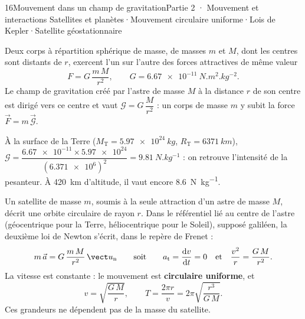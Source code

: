\begin{ouverture}[gravitation]{16}{Mouvement dans un champ de gravitation}{Partie 2 · Mouvement et interactions}
{Satellites et planètes\enspace·\enspace Mouvement circulaire uniforme\enspace·\enspace Lois de Kepler\enspace·\enspace Satellite géostationnaire}
\end{ouverture}
\essentiel
{}
\begin{loi}
Deux corps à répartition sphérique de masse, de masses $m$ et $M$, dont les centres sont distants de $r$, exercent l'un
sur l'autre des forces attractives de même valeur
\[F=G\,\frac{m\,M}{r^2},\qquad G=\qty{6,67e-11}{N.m^2.kg^{-2}}.\]
Le champ de gravitation créé par l'astre de masse $M$ à la distance $r$ de son centre est dirigé vers ce centre et vaut
$\mathcal{G}=G\,\dfrac{M}{r^2}$ : un corps de masse $m$ y subit la force $\vec{F}=m\,\vec{\mathcal{G}}$.
\end{loi}
\begin{exemple}
À la surface de la Terre ($M_\mathrm{T}=\qty{5,97e24}{kg}$, $R_\mathrm{T}=\qty{6371}{km}$),
$\mathcal{G}=\dfrac{\num{6.67e-11}\times\num{5.97e24}}{(\num{6.371e6})^2}=\qty{9,81}{N.kg^{-1}}$ : on retrouve l'intensité de la
pesanteur. À 420~km d'altitude, il vaut encore \qty{8,6}{N.kg^{-1}}.
\end{exemple}
\begin{propriete}
Un satellite de masse $m$, soumis à la seule attraction d'un astre de masse $M$, décrit une orbite circulaire de rayon
$r$. Dans le référentiel lié au centre de l'astre (géocentrique pour la Terre, héliocentrique pour le Soleil), supposé
galiléen, la deuxième loi de Newton s'écrit, dans le repère de Frenet :
\[m\,\vec{a}=G\,\frac{m\,M}{r^2}\,\un\qquad\text{soit}\qquad a_\mathrm{t}=\ddt{v}=0\quad\text{et}\quad\frac{v^2}{r}=\frac{G\,M}{r^2}.\]
La vitesse est constante : le mouvement est \textbf{circulaire uniforme}, et
\[v=\sqrt{\frac{G\,M}{r}},\qquad T=\frac{2\pi r}{v}=2\pi\sqrt{\frac{r^3}{G\,M}}.\]
Ces grandeurs ne dépendent pas de la masse du satellite.
\end{propriete}
